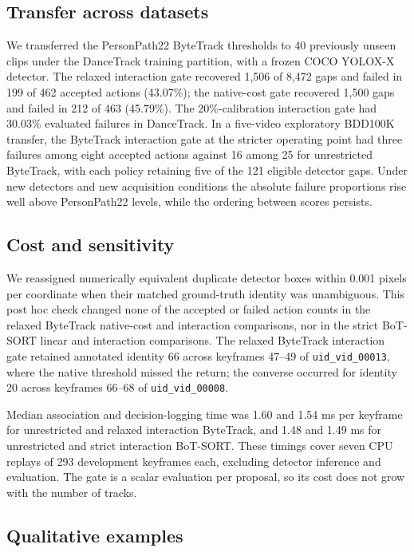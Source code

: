 \subsection{Transfer across datasets}
We transferred the PersonPath22 ByteTrack thresholds to 40 previously
unseen clips under the DanceTrack training partition, with a frozen COCO
YOLOX-X detector. The relaxed interaction gate recovered 1,506 of 8,472
gaps and failed in 199 of 462 accepted actions (43.07\%); the native-cost
gate recovered 1,500 gaps and failed in 212 of 463 (45.79\%). The
20\%-calibration interaction gate had 30.03\% evaluated failures in
DanceTrack. In a five-video exploratory BDD100K transfer, the ByteTrack
interaction gate at the stricter operating point had three failures among
eight accepted actions against 16 among 25 for unrestricted ByteTrack,
with each policy retaining five of the 121 eligible detector gaps. Under
new detectors and new acquisition conditions the absolute failure
proportions rise well above PersonPath22 levels, while the ordering
between scores persists.

\subsection{Cost and sensitivity}
We reassigned numerically equivalent duplicate detector boxes within 0.001
pixels per coordinate when their matched ground-truth identity was
unambiguous. This post hoc check changed none of the accepted or failed
action counts in the relaxed ByteTrack native-cost and interaction
comparisons, nor in the strict BoT-SORT linear and interaction
comparisons. The relaxed ByteTrack interaction gate retained annotated
identity 66 across keyframes 47--49 of \texttt{uid\_vid\_00013}, where the
native threshold missed the return; the converse occurred for identity 20
across keyframes 66--68 of \texttt{uid\_vid\_00008}.

Median association and decision-logging time was 1.60 and 1.54 ms per
keyframe for unrestricted and relaxed interaction ByteTrack, and 1.48 and
1.49 ms for unrestricted and strict interaction BoT-SORT. These timings
cover seven CPU replays of 293 development keyframes each, excluding
detector inference and evaluation. The gate is a scalar evaluation per
proposal, so its cost does not grow with the number of tracks.

\subsection{Qualitative examples}

